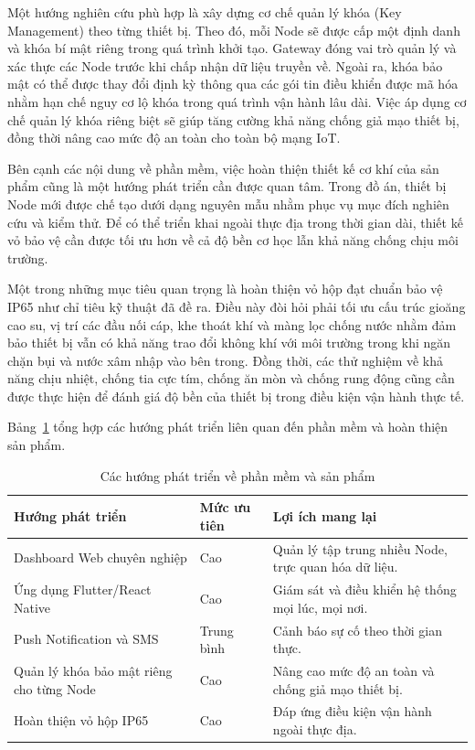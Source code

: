Một hướng nghiên cứu phù hợp là xây dựng cơ chế quản lý khóa (Key Management) theo từng thiết bị. Theo đó, mỗi Node sẽ được cấp một định danh và khóa bí mật riêng trong quá trình khởi tạo. Gateway đóng vai trò quản lý và xác thực các Node trước khi chấp nhận dữ liệu truyền về. Ngoài ra, khóa bảo mật có thể được thay đổi định kỳ thông qua các gói tin điều khiển được mã hóa nhằm hạn chế nguy cơ lộ khóa trong quá trình vận hành lâu dài. Việc áp dụng cơ chế quản lý khóa riêng biệt sẽ giúp tăng cường khả năng chống giả mạo thiết bị, đồng thời nâng cao mức độ an toàn cho toàn bộ mạng IoT.

Bên cạnh các nội dung về phần mềm, việc hoàn thiện thiết kế cơ khí của sản phẩm cũng là một hướng phát triển cần được quan tâm. Trong đồ án, thiết bị Node mới được chế tạo dưới dạng nguyên mẫu nhằm phục vụ mục đích nghiên cứu và kiểm thử. Để có thể triển khai ngoài thực địa trong thời gian dài, thiết kế vỏ bảo vệ cần được tối ưu hơn về cả độ bền cơ học lẫn khả năng chống chịu môi trường.

Một trong những mục tiêu quan trọng là hoàn thiện vỏ hộp đạt chuẩn bảo vệ IP65 như chỉ tiêu kỹ thuật đã đề ra. Điều này đòi hỏi phải tối ưu cấu trúc gioăng cao su, vị trí các đầu nối cáp, khe thoát khí và màng lọc chống nước nhằm đảm bảo thiết bị vẫn có khả năng trao đổi không khí với môi trường trong khi ngăn chặn bụi và nước xâm nhập vào bên trong. Đồng thời, các thử nghiệm về khả năng chịu nhiệt, chống tia cực tím, chống ăn mòn và chống rung động cũng cần được thực hiện để đánh giá độ bền của thiết bị trong điều kiện vận hành thực tế.

Bảng~\ref{tab:software_future} tổng hợp các hướng phát triển liên quan đến phần mềm và hoàn thiện sản phẩm.

\begin{table}[H]
\centering
\caption{Các hướng phát triển về phần mềm và sản phẩm}
\label{tab:software_future}
\begin{tabular}{p{4.5cm} p{2.5cm} p{6.5cm}}
\hline
\textbf{Hướng phát triển} &
\textbf{Mức ưu tiên} &
\textbf{Lợi ích mang lại} \\
\hline
Dashboard Web chuyên nghiệp &
Cao &
Quản lý tập trung nhiều Node, trực quan hóa dữ liệu. \\

Ứng dụng Flutter/React Native &
Cao &
Giám sát và điều khiển hệ thống mọi lúc, mọi nơi. \\

Push Notification và SMS &
Trung bình &
Cảnh báo sự cố theo thời gian thực. \\

Quản lý khóa bảo mật riêng cho từng Node &
Cao &
Nâng cao mức độ an toàn và chống giả mạo thiết bị. \\

Hoàn thiện vỏ hộp IP65 &
Cao &
Đáp ứng điều kiện vận hành ngoài thực địa. \\
\hline
\end{tabular}
\end{table}

